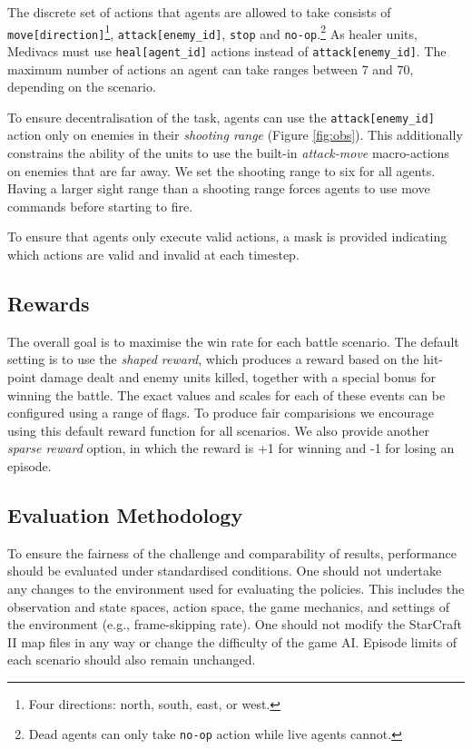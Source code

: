 \documentclass[twoside,11pt]{article}
\begin{document}
The discrete set of actions that agents are allowed to take consists of \texttt{move[direction]}\footnote{Four directions: north, south, east, or west.}, \texttt{attack[enemy\_id]}, \texttt{stop} and \texttt{no-op}.\footnote{Dead agents can only take \texttt{no-op} action while live agents cannot.}
As healer units, Medivacs must use \texttt{heal[agent\_id]} actions instead of \texttt{attack[enemy\_id]}. The maximum number of actions an agent can take ranges between 7 and 70, depending on the scenario.

To ensure decentralisation of the task, agents can use the \texttt{attack[enemy\_id]} action only on enemies in their \textit{shooting range} (Figure \ref{fig:obs}).
This additionally constrains the ability of the units to use the built-in \emph{attack-move} macro-actions on enemies that are far away. We set the shooting range to six for all agents. Having a larger sight range than a shooting range forces agents to use move commands before starting to fire.

To ensure that agents only execute valid actions, a mask is provided indicating which actions are valid and invalid at each timestep.

\subsection{Rewards}

The overall goal is to maximise the win rate for each battle scenario.
The default setting is to use the \textit{shaped reward}, which produces a reward based on the hit-point damage dealt and enemy units killed, together with a special bonus for winning the battle.
The exact values and scales for each of these events can be configured using a range of flags. 
To produce fair comparisions we encourage using this default reward function for all scenarios.
We also provide another \textit{sparse reward} option, in which the reward is +1 for winning and -1 for losing an episode.



\subsection{Evaluation Methodology}
To ensure the fairness of the challenge and comparability of results, performance should be evaluated under standardised conditions. 
One should not undertake any changes to the environment used for evaluating the policies. 
This includes the observation and state spaces, action space, the game mechanics, and settings of the environment (e.g., frame-skipping rate).
One should not modify the StarCraft II map files in any way or change the difficulty of the game AI. Episode limits of each scenario should also remain unchanged. 
\end{document}
